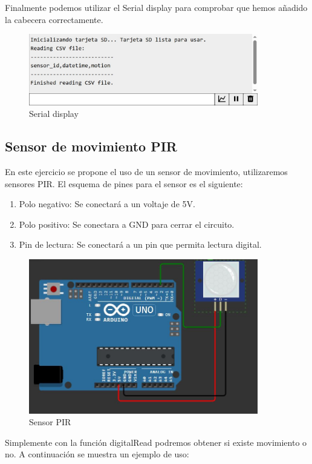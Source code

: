 Finalmente podemos utilizar el Serial display para comprobar que hemos añadido la cabecera correctamente.


\begin{figure}[H]
    \centering
    \includegraphics[width = 10cm]{ImagenesLatex/res_csv_header.JPG}{}
    \caption{Serial display}
\end{figure}


\subsection{Sensor de movimiento PIR}
En este ejercicio se propone el uso de un sensor de movimiento, utilizaremos sensores PIR. El esquema de pines para el sensor es el siguiente:
\begin{enumerate}
    \item Polo negativo: Se conectará a un voltaje de 5V.
    \item Polo positivo: Se conectara a GND para cerrar el circuito.
    \item Pin de lectura: Se conectará a un pin que permita lectura digital.
\end{enumerate}

\begin{figure}[H]
    \centering
    \includegraphics[width = 10cm]{ImagenesLatex/pir.JPG}{}
    \caption{Sensor PIR}
\end{figure}

Simplemente con la función digitalRead podremos obtener si existe movimiento o no. A continuación se muestra un ejemplo de uso:

